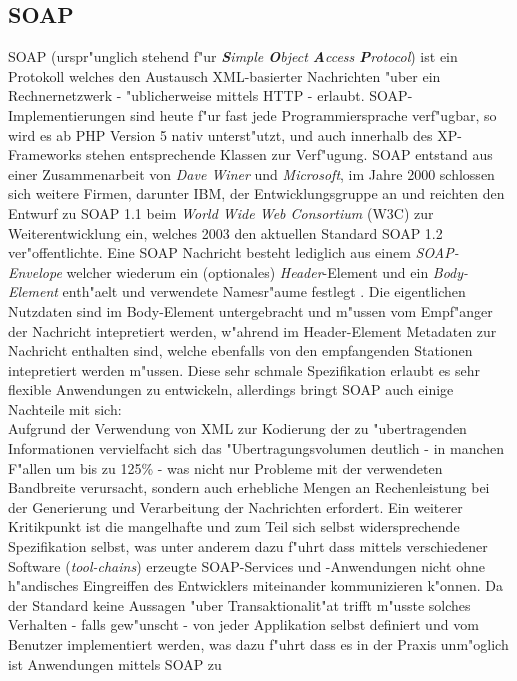 \subsection{SOAP}
\label{sec:intro:stand:soap}
SOAP (urspr"unglich stehend f"ur \emph{\textbf{S}imple \textbf{O}bject \textbf{A}ccess \textbf{P}rotocol})
ist ein Protokoll welches den Austausch XML-basierter Nachrichten "uber ein Rechnernetzwerk - "ublicherweise
mittels HTTP - erlaubt. SOAP-Implementierungen sind heute f"ur fast jede Programmiersprache verf"ugbar, so wird es
ab PHP Version 5 nativ unterst"utzt, und auch innerhalb des XP-Frameworks stehen entsprechende Klassen zur Verf"ugung.
SOAP entstand aus einer Zusammenarbeit von \emph{Dave Winer} und \emph{Microsoft}, im Jahre 2000 schlossen sich 
weitere Firmen, darunter IBM, der Entwicklungsgruppe an und reichten den Entwurf zu SOAP 1.1 beim 
\emph{World Wide Web Consortium} (W3C) zur Weiterentwicklung ein, welches 2003 den aktuellen Standard SOAP 1.2
ver"offentlichte.
Eine SOAP Nachricht besteht lediglich aus einem \emph{SOAP-Envelope} welcher wiederum ein (optionales) \emph{Header}-Element
und ein \emph{Body-Element} enth"aelt und verwendete Namesr"aume festlegt \cite{SOAPSPEC}. Die eigentlichen Nutzdaten sind
im Body-Element untergebracht und m"ussen vom Empf"anger der Nachricht intepretiert werden, w"ahrend im Header-Element Metadaten
zur Nachricht enthalten sind, welche ebenfalls von den empfangenden Stationen intepretiert werden m"ussen. Diese sehr schmale
Spezifikation erlaubt es sehr flexible Anwendungen zu entwickeln, allerdings bringt SOAP auch einige Nachteile mit sich:\\
Aufgrund der Verwendung von XML zur Kodierung der zu "ubertragenden Informationen vervielfacht sich das "Ubertragungsvolumen
deutlich - in manchen F"allen um bis zu 125\% - was nicht nur Probleme mit der verwendeten Bandbreite verursacht, sondern auch
erhebliche Mengen an Rechenleistung bei der Generierung und Verarbeitung der Nachrichten erfordert. Ein weiterer Kritikpunkt ist
die mangelhafte und zum Teil sich selbst widersprechende Spezifikation selbst, was unter anderem dazu f"uhrt dass mittels verschiedener
Software (\emph{tool-chains}) erzeugte SOAP-Services und -Anwendungen nicht ohne h"andisches Eingreiffen des Entwicklers miteinander kommunizieren 
k"onnen.
Da der Standard keine Aussagen "uber Transaktionalit"at trifft m"usste solches Verhalten - falls gew"unscht - von jeder Applikation selbst
definiert und vom Benutzer implementiert werden, was dazu f"uhrt dass es in der Praxis unm"oglich ist Anwendungen mittels SOAP zu
